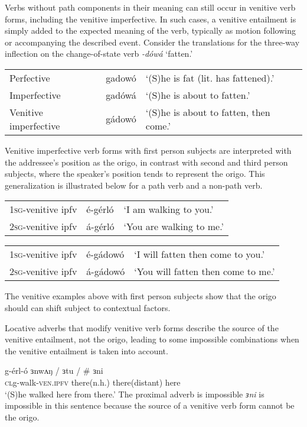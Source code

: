 Verbs without path components in their meaning can still occur in venitive verb forms, including the venitive imperfective.  In such cases, a venitive entailment is simply added to the expected meaning of the verb, typically as motion following or accompanying the described event. Consider the translations for the three-way inflection on the change-of-state verb \textit{-dówá} `fatten.'
\ea \begin{tabular}[t]{lll}
Perfective &  gadowó	& 	‘(S)he is fat (lit. has fattened).’\\
Imperfective & gadówá	& ‘(S)he is about to fatten.’\\
Venitive imperfective &  gádowó  &  ‘(S)he is about to fatten, then come.’\\
\end{tabular} %
\z

Venitive imperfective verb forms with first person subjects are interpreted with the addressee's position as the origo, in contrast with second and third person subjects, where the speaker's position tends to represent the origo. This generalization is illustrated below for a path verb and a non-path verb.

\ea \begin{tabular}[t]{lll}
\textsc{1sg}-venitive ipfv & é-gérló	& 	‘I am walking to you.’ \\
\textsc{2sg}-venitive ipfv & á-gérló	& 	‘You are walking to me.’ \\
\end{tabular}
\ex \begin{tabular}[t]{lll}
\textsc{1sg}-venitive ipfv & é-gádowó	& 	‘I will fatten then come to you.’ \\
\textsc{2sg}-venitive ipfv & á-gádowó	& 	‘You will fatten then come to me.’ \\
\end{tabular}
\z
The venitive examples above with first person subjects show that the origo should can shift subject to contextual factors.

Locative adverbs that modify venitive verb forms describe the source of the venitive entailment, not the origo, leading to some impossible combinations when the venitive entailment is taken into account.

\ea  \gll  g-érl-ó ɜnwʌŋ / ɜtu / \# ɜni \\
	  \textsc{cl}g-walk-\textsc{ven.ipfv} there(n.h.) {} there(distant) {} here \\ 
\glt  ‘(S)he walked here from there.'		
\z 
The proximal adverb is impossible \textit{ɜni} is impossible in this sentence because the source of a venitive verb form cannot be the origo.
%
%
%

